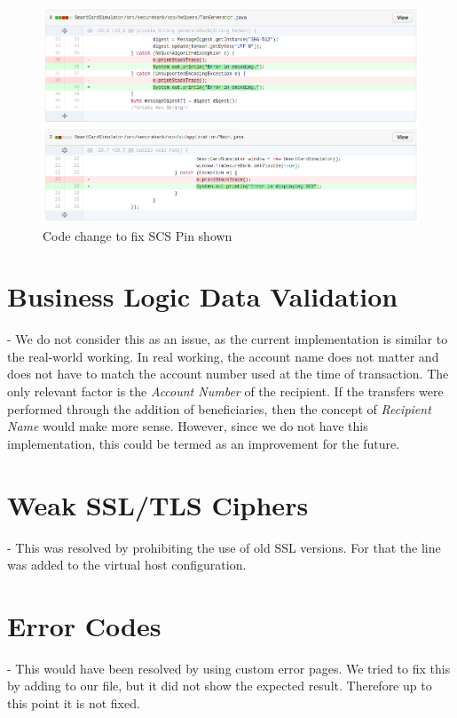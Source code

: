\begin{figure}[ht]
	\centering
	\includegraphics[width=.8\linewidth]{figures/fix_scs_pin_shown.png}
	\caption{Code change to fix SCS Pin shown}
	\label{fig:fix_scs_pin_shown}
\end{figure}

\clearpage 

\section{Business Logic Data Validation} - We do not consider this as an issue, as the current implementation is similar to the real-world working. In real working, the account name does not matter and does not  have to match the account number used at the time of transaction. The only relevant factor is the \textit{Account Number} of the recipient.
If the transfers were performed through the addition of beneficiaries, then the concept of \textit{Recipient Name} would make more sense. However, since we do not have this implementation, this could be termed as an improvement for the future.

\section{Weak SSL/TLS Ciphers} - This was resolved by prohibiting the use of old SSL versions. For that the line  was added to the virtual host configuration.

\section{Error Codes} - This would have been resolved by using custom error pages. We tried to fix this by adding  to our  file, but it did not show the expected result. Therefore up to this point it is not fixed.

